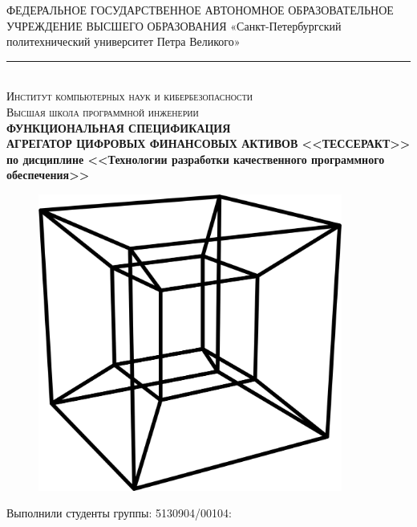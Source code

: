 \documentclass[a4paper, 14pt]{article}
\begin{document}
\begin{titlepage}
    \center

    ФЕДЕРАЛЬНОЕ ГОСУДАРСТВЕННОЕ АВТОНОМНОЕ ОБРАЗОВАТЕЛЬНОЕ УЧРЕЖДЕНИЕ ВЫСШЕГО ОБРАЗОВАНИЯ\linebreak
    «Санкт-Петербургский политехнический университет Петра Великого»
    \noindent\rule{500pt}{0.8pt} \\
    \textsc{\Large Институт компьютерных наук и кибербезопасности}\\
    \textsc{\large Высшая школа программной инженерии}\\[1.5cm]

    { \huge \bfseries ФУНКЦИОНАЛЬНАЯ СПЕЦИФИКАЦИЯ	\\
    \Large \mdseries АГРЕГАТОР ЦИФРОВЫХ ФИНАНСОВЫХ АКТИВОВ <<ТЕССЕРАКТ>> \\
    \large по дисциплине <<Технологии разработки качественного программного обеспечения>>}\\
    \flushright{
        {\phantom{qwe}}\\[1.0cm]
    }

    \begin{figure}[H]
        \centering
        \includegraphics[width=10cm]{1.png}\\[2.0cm]
    \end{figure}

    \begin{multicols}{2}
        \begin{flushright} \large

            {Выполнили студенты группы: 5130904/00104:}\\
            {\phantom{qwe}}\\
            {\phantom{qwe}}\\
            {\phantom{qwe}}\\
            {\phantom{qwe}}\\


\end{flushright}
\end{multicols}
\end{titlepage}
\end{document}
